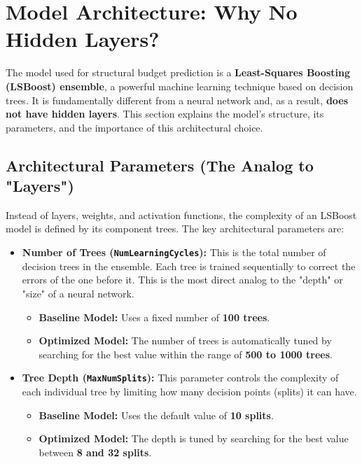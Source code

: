 \documentclass[11pt]{article}
\begin{document}
\section*{Model Architecture: Why No Hidden Layers?}
The model used for structural budget prediction is a \textbf{Least-Squares Boosting (LSBoost) ensemble}, a powerful machine learning technique based on decision trees. It is fundamentally different from a neural network and, as a result, \textbf{does not have hidden layers}. This section explains the model's structure, its parameters, and the importance of this architectural choice.

\subsection*{Architectural Parameters (The Analog to "Layers")}
Instead of layers, weights, and activation functions, the complexity of an LSBoost model is defined by its component trees. The key architectural parameters are:
\begin{itemize}
    \item \textbf{Number of Trees (\texttt{NumLearningCycles}):} This is the total number of decision trees in the ensemble. Each tree is trained sequentially to correct the errors of the one before it. This is the most direct analog to the "depth" or "size" of a neural network.
        \begin{itemize}
            \item \textbf{Baseline Model:} Uses a fixed number of \textbf{100 trees}.
            \item \textbf{Optimized Model:} The number of trees is automatically tuned by searching for the best value within the range of \textbf{500 to 1000 trees}.
        \end{itemize}
    \item \textbf{Tree Depth (\texttt{MaxNumSplits}):} This parameter controls the complexity of each individual tree by limiting how many decision points (splits) it can have.
        \begin{itemize}
            \item \textbf{Baseline Model:} Uses the default value of \textbf{10 splits}.
            \item \textbf{Optimized Model:} The depth is tuned by searching for the best value between \textbf{8 and 32 splits}.
        \end{itemize}
\end{itemize}
\end{document}
